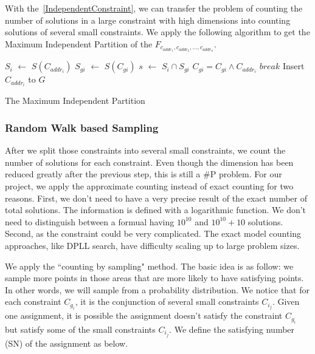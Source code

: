 With the~\ref{IndependentConstraint}, we can transfer the problem of counting the number of 
solutions in a large constraint with high
dimensions into counting solutions of 
several small constraints. We apply the following algorithm to get the Maximum Independent Partition
of the $F_{c_{addr_1},c_{addr_2},...,c_{addr_n}}$.

\IncMargin{1em}
\begin{algorithm}[h]
\DontPrintSemicolon
{}
{
   $S_i$ $\leftarrow$ $S(C_{addr_i})$ \;
   {
   $S_{gi}$ $\leftarrow$ $S(C_{gi})$ \;
   $s$ $\leftarrow$ $S_i \cap S_{gi}$  \;
   {
      $C_{gi} = C_{gi} \land C_{addr_i}$ \;
      $break$ \;
   }
   Insert $C_{{addr}_i}$ to $G$
   }
}
\caption{The Maximum Independent Partition}
\end{algorithm}
\DecMargin{1em}

\subsubsection{Random Walk based Sampling}

After we split those constraints into several small constraints, we count
the number of solutions for each constraint. Even though the dimension
has been reduced greatly after the previous step, this is still a
\#P problem. For our project, we apply the approximate counting instead of
exact counting for two reasons. First, we don't need to have a very precise
result of the exact number of total solutions. The information is defined with
a logarithmic function. We don't need to distinguish between a formual having
$10^{10}$ and $10^{10} + 10$ solutions.
Second, as the constraint could be very complicated. The exact model counting
approaches, like DPLL search, have difficulty scaling up to large problem sizes.

We apply the ``counting by sampling" method. The basic idea is as follow: we 
sample more points in those areas that are more likely to have satisfying
points. In other words, we will sample from a probability distribution. We 
notice that for each constraint $C_{g_i}$, it is the conjunction of several
small constraints $C_{i_j}$. Given one assignment, it is possible the assignment
doesn't satisfy the constraint $C_{g_i}$ but satisfy some of the small constraints $C_{i_j}$.
We define the satisfying number (SN) of the assignment as below.

